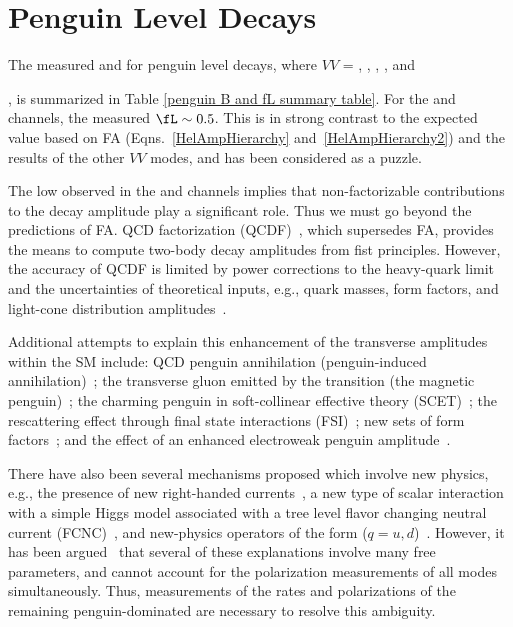 \section{Penguin Level \bm{\Bvv} Decays\label{Penguin level Bvv decays}}
The measured \calB and \fL for penguin level \Bvv decays, where $VV$ = \PhiKst, \RhoKst, \OmeKst, \KstzKstzbar, \KstzKstz and {\OmePhi, is summarized in Table \ref{penguin B and fL summary table}. For the \PhiKst and \RhoKstz channels, the measured $\fL\sim0.5$. This is in strong contrast to the expected value based on FA (Eqns.~\ref{HelAmpHierarchy} and~\ref{HelAmpHierarchy2}) and the results of the other $VV$ modes, and has been considered as a puzzle. 

The low \fL observed in the \PhiKst and \RhoKstz channels implies that non-factorizable contributions to the decay amplitude play a significant role. Thus we must go beyond the predictions of FA. QCD factorization (QCDF)~\cite{QCDF1,QCDF2,QCDF3}, which supersedes FA, provides the means to compute two-body decay amplitudes from fist principles. However, the accuracy of QCDF is limited by power corrections to the heavy-quark limit and the uncertainties of theoretical inputs, e.g., quark masses, form factors, and light-cone distribution amplitudes~\cite{QCDF2}. %

Additional attempts to explain this enhancement of the transverse amplitudes within the SM include: QCD penguin annihilation (penguin-induced annihilation)~\cite{Kagan QCD peng annih}; the transverse gluon emitted by the \bsg transition (the magnetic penguin)~\cite{magnetic penguin}; the charming penguin in soft-collinear effective theory (SCET)~\cite{charming penguins}; the rescattering effect through final state interactions (FSI)~\cite{Ladisa etal FSI, Cheng Chua Soni FSI, Colangelo FSI}; new sets of form factors~\cite{new sets of form factors}; and the effect of an enhanced electroweak penguin amplitude~\cite{Beneke etal Enhanced Electroweak Penguin Amplitudes}. 

There have also been several mechanisms proposed which involve new physics, e.g., the presence of new right-handed currents~\cite{Grossman Beyond the SM with B and K physics, RH currents}, a new type of scalar interaction with a simple Higgs model associated with a tree level flavor changing neutral current (FCNC)~\cite{scalar interactions}, and new-physics operators of the form \bsqq ($q = u,d$)~\cite{NP operators}. However, it has been argued~\cite{Li and Mishima Polarization in Bvv decays} that several of these explanations involve many free parameters, and cannot account for the polarization measurements of all \Bvv modes simultaneously. Thus, measurements of the rates and polarizations of the remaining penguin-dominated \Bvv are necessary to resolve this ambiguity. %

}

